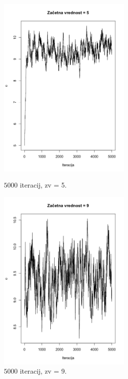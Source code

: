 \documentclass[a4paper,11pt]{article}
\begin{document}
    \begin{figure}[ht!]
        \begin{minipage}{0.5\textwidth}
            \centering
            \includegraphics[width = 65mm]{Slike/2_2_5000_zv5.png}
            \caption{$5000$ iteracij, zv = 5.}
        \end{minipage}
        \begin{minipage}{0.5\textwidth}
            \centering
            \includegraphics[width = 65mm]{Slike/2_2_5000_zv9.png}
            \caption{$5000$ iteracij, zv = 9.}
        \end{minipage}
    \end{figure}
\end{document}
